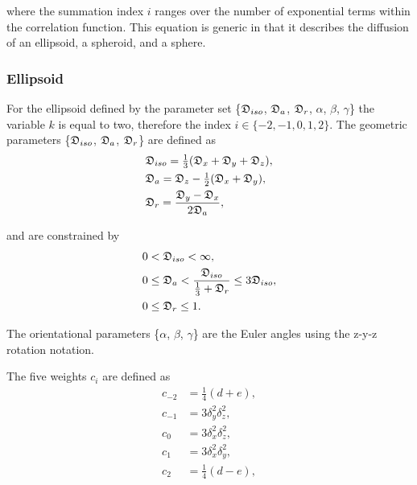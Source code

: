 \noindent where the summation index $i$ ranges over the number of exponential terms within the correlation function.  This equation is generic in that it describes the diffusion of an ellipsoid, a spheroid, and a sphere.


\subsubsection{Ellipsoid}
For the ellipsoid defined by the parameter set \{$\mathfrak{D}_{iso}$, $\mathfrak{D}_a$, $\mathfrak{D}_r$, $\alpha$, $\beta$, $\gamma$\} the variable $k$ is equal to two, therefore the index $i \in \{-2, -1, 0, 1, 2\}$.  The geometric parameters \{$\mathfrak{D}_{iso}$, $\mathfrak{D}_a$, $\mathfrak{D}_r$\} are defined as
\begin{subequations}
\begin{align}
 & \mathfrak{D}_{iso} = \tfrac{1}{3} (\mathfrak{D}_x + \mathfrak{D}_y + \mathfrak{D}_z ),   \label{eq: Diso ellipsoid def} \\
 & \mathfrak{D}_a = \mathfrak{D}_z - \tfrac{1}{2}(\mathfrak{D}_x + \mathfrak{D}_y),         \label{eq: Da ellipsoid def} \\
 & \mathfrak{D}_r = \frac{\mathfrak{D}_y - \mathfrak{D}_x}{2\mathfrak{D}_a},                \label{eq: Dr ellipsoid def}
\end{align}
\end{subequations}

\noindent and are constrained by
\begin{subequations}
\begin{align}
 0 & < \mathfrak{D}_{iso} < \infty,                                                    \label{eq: Diso lim} \\
 0 & \le \mathfrak{D}_a < \frac{\mathfrak{D}_{iso}}{\tfrac{1}{3} + \mathfrak{D}_r} \le 3\mathfrak{D}_{iso}, \label{eq: Da lim} \\
 0 & \le \mathfrak{D}_r \le 1.                                                         \label{eq: Dr lim}
\end{align}
\end{subequations}

\noindent The orientational parameters \{$\alpha$, $\beta$, $\gamma$\} are the Euler angles using the z-y-z rotation notation.


The five weights $c_i$ are defined as
\begin{subequations}
\begin{align}
 c_{-2} &= \tfrac{1}{4}(d + e),     \label{eq: ellipsoid c-2} \\
 c_{-1} &= 3\delta_y^2\delta_z^2,   \label{eq: ellipsoid c-1} \\
 c_{0}  &= 3\delta_x^2\delta_z^2,   \label{eq: ellipsoid c0} \\
 c_{1}  &= 3\delta_x^2\delta_y^2,   \label{eq: ellipsoid c1} \\
 c_{2}  &= \tfrac{1}{4}(d - e),     \label{eq: ellipsoid c2}
\end{align}
\end{subequations}

